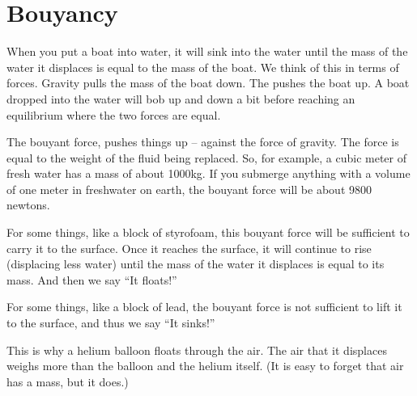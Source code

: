 \chapter{Bouyancy}

When you put a boat into water, it will sink into the water until
the mass of the water it displaces is equal to the mass of the
boat. We think of this in terms of forces. Gravity pulls the mass of
the boat down. The  pushes the boat up. A boat
dropped into the water will bob up and down a bit before reaching an
equilibrium where the two forces are equal.

The bouyant force, pushes things up -- against the force of
gravity. The force is equal to the weight of the fluid being
replaced. So, for example, a cubic meter of fresh water has a mass of
about 1000kg.  If you submerge anything with a volume of one meter in
freshwater on earth, the bouyant force will be about 9800 newtons.


For some things, like a block of styrofoam, this bouyant force will be
sufficient to carry it to the surface. Once it reaches the surface, it
will continue to rise (displacing less water) until the mass of the
water it displaces is equal to its mass. And then we say ``It floats!''

For some things, like a block of lead, the bouyant force is not
 sufficient to lift it to the surface, and thus we say ``It sinks!''

This is why a helium balloon floats through the air. The air
that it displaces weighs more than the balloon and the helium itself. (It is easy to forget that air has a mass, but it does.)


